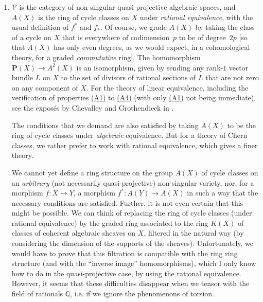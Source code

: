 \documentclass{article}
\theoremstyle{plain}
\theoremstyle{definition}
\newcommand{\cat}[1]{{\mathcal{#1}}}
\newcommand{\PP}{\mathbf{P}}
\newcommand{\oldpage}[1]{\marginpar{\footnotesize$\Big\vert$ \textit{p.~#1}}}
\begin{document}
\begin{enumerate}
  \item
    $\cat{V}$ is the category of non-singular quasi-projective algebraic spaces, and $A(X)$ is the ring of cycle classes on $X$ under \emph{rational equivalence}, with the usual definition of $f^*$ and $f_*$.
    Of course, we grade $A(X)$ by taking the class of a cycle on $X$ that is everywhere of codimension~$p$ to be of degree~$2p$ [so that $A(X)$ has only even degrees, as we would expect, in a cohomological theory, for a graded \emph{commutative} ring].
    The homomorphism $\PP(X)\to A^2(X)$ is an isomorphism, given by sending any rank-$1$ vector bundle $L$ on $X$ to the set of divisors of rational sections of $L$ that are not zero on any component of $X$.
    For the theory of linear equivalence, including the verification of properties \hyperref[axiomA1]{(A1)} to \hyperref[axiomA4]{(A4)} (with only \hyperref[axiomA1]{(A1)} not being immediate), see the expos\'{e}s by Chevalley and Grothendieck in \cite{4}.

    The conditions that we demand are also satisfied by taking $A(X)$ to be the ring of cycle classes under \emph{algebraic} equivalence.
    But for a theory
\oldpage{143}
    of Chern classes, we rather prefer to work with rational equivalence, which gives a finer theory.

    We cannot yet define a ring structure on the group $A(X)$ of cycle classes on an \emph{arbitrary} (not necessarily quasi-projective) non-singular variety, nor, for a morphism $f\colon X\to Y$, a morphism $f^*\colon A(Y)\to A(X)$ in such a way that the necessary conditions are satisfied.
    Further, it is not even certain that this might be possible.
    We can think of replacing the ring of cycle classes (under rational equivalence) by the graded ring associated to the ring $K(X)$ of classes of coherent algebraic sheaves on $X$, filtered in the natural way (by considering the dimension of the supports of the sheaves).
    Unfortunately, we would have to prove that this filtration is compatible with the ring ring structure (and with the ``inverse image'' homomorphisms), which I only know how to do in the quasi-projective case, by using the rational equivalence.
    However, it seems that these difficulties disappear when we tensor with the field of rationals $\mathbb{Q}$, i.e. if we ignore the phenomenons of torsion.


\end{enumerate}
\end{document}
